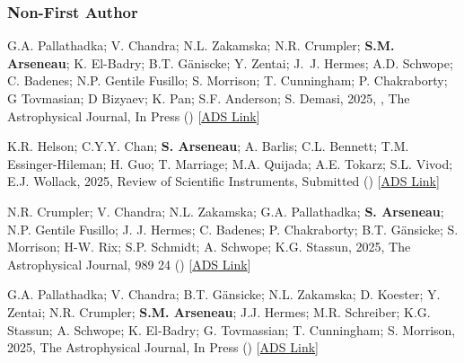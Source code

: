 \documentclass[12pt,letterpaper]{article}
\begin{document}
\subsubsection{Non-First Author}
\begin{list}{}{\cvlist}
  \item[{\color{numcolor}\scriptsize10}] G.A. Pallathadka; V. Chandra; N.L. Zakamska; N.R. Crumpler; \textbf{S.M. Arseneau}; K. El-Badry; B.T. G\"aniscke; Y. Zentai; J.~J. Hermes; A.D. Schwope; C. Badenes; N.P. Gentile Fusillo; S. Morrison; T. Cunningham; P. Chakraborty; G Tovmasian; D Bizyaev; K. Pan; S.F. Anderson; S. Demasi, 2025, , The Astrophysical Journal, In Press () [\href{https://ui.adsabs.harvard.edu/abs/2025arXiv250902906A}{ADS Link}]
  
  \item[{\color{numcolor}\scriptsize9}] K.R. Helson; C.Y.Y. Chan; \textbf{S. Arseneau}; A. Barlis; C.L. Bennett; T.M. Essinger-Hileman; H. Guo; T. Marriage; M.A. Quijada; A.E. Tokarz; S.L. Vivod; E.J. Wollack, 2025,  Review of Scientific Instruments, Submitted () [\href{https://ui.adsabs.harvard.edu/abs/2025arXiv250820406H}{ADS Link}]
  
  \item[{\color{numcolor}\scriptsize8}] N.R. Crumpler; V. Chandra; N.L. Zakamska; G.A. Pallathadka; \textbf{S. Arseneau}; N.P. Gentile Fusillo; J. J. Hermes; C. Badenes; P. Chakraborty; B.T. G\"ansicke; S. Morrison; H-W. Rix; S.P. Schmidt; A. Schwope; K.G. Stassun, 2025,  The Astrophysical Journal, 989 24 () [\href{https://ui.adsabs.harvard.edu/abs/2025ApJ...989...24C/abstract}{ADS Link}]
  
  \item[{\color{numcolor}\scriptsize7}] G.A. Pallathadka; V. Chandra; B.T. G\"ansicke; N.L. Zakamska; D. Koester; Y. Zentai; N.R. Crumpler; \textbf{S.M. Arseneau}; J.J. Hermes; M.R. Schreiber; K.G. Stassun; A. Schwope; K. El-Badry; G. Tovmassian; T. Cunningham; S. Morrison, 2025,  The Astrophysical Journal, In Press () [\href{https://ui.adsabs.harvard.edu/abs/2025arXiv250711618A}{ADS Link}]
  

\end{list}
\end{document}
